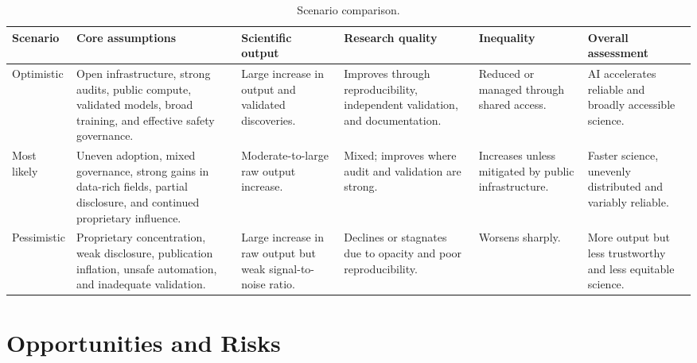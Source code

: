 \documentclass[12pt]{article}
\begin{document}
\begin{table}[H]
\centering
\caption{Scenario comparison.}
\small
\begin{tabularx}{\textwidth}{p{2.2cm}X X X X X}
\toprule
\textbf{Scenario} & \textbf{Core assumptions} & \textbf{Scientific output} & \textbf{Research quality} & \textbf{Inequality} & \textbf{Overall assessment} \\
\midrule
Optimistic & Open infrastructure, strong audits, public compute, validated models, broad training, and effective safety governance. & Large increase in output and validated discoveries. & Improves through reproducibility, independent validation, and documentation. & Reduced or managed through shared access. & AI accelerates reliable and broadly accessible science. \\
Most likely & Uneven adoption, mixed governance, strong gains in data-rich fields, partial disclosure, and continued proprietary influence. & Moderate-to-large raw output increase. & Mixed; improves where audit and validation are strong. & Increases unless mitigated by public infrastructure. & Faster science, unevenly distributed and variably reliable. \\
Pessimistic & Proprietary concentration, weak disclosure, publication inflation, unsafe automation, and inadequate validation. & Large increase in raw output but weak signal-to-noise ratio. & Declines or stagnates due to opacity and poor reproducibility. & Worsens sharply. & More output but less trustworthy and less equitable science. \\
\bottomrule
\end{tabularx}
\end{table}

\section{Opportunities and Risks}
\end{document}

